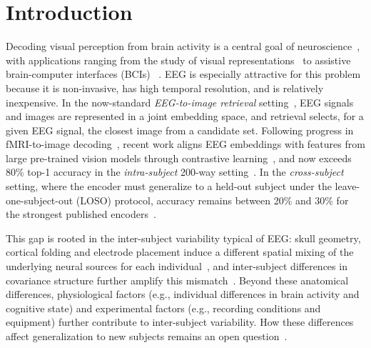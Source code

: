 \documentclass[10pt,twocolumn,letterpaper]{article}
\begin{document}
\section{Introduction}
\label{sec:intro}

Decoding visual perception from brain activity is a central goal of neuroscience~\cite{kamitani2005decoding,carlson2013representational,grootswagers2017decoding}, with applications ranging from the study of visual representations~\cite{cichy2014resolving,contini2017decoding} to assistive brain-computer interfaces (BCIs) ~\cite{lawhern2018eegnet,gao2021interface}. EEG is especially attractive for this problem because it is non-invasive, has high temporal resolution, and is relatively inexpensive. In the now-standard \emph{EEG-to-image retrieval} setting~\cite{spampinato2017deep,gifford2022things,grootswagers2022things}, EEG signals and images are represented in a joint embedding space, and retrieval selects, for a given EEG signal, the closest image from a candidate set. Following progress in fMRI-to-image decoding~\cite{takagi2023highres,ozcelik2023natural,scotti2023mindeye,scotti2024mindeye2}, recent work aligns EEG embeddings with features from large pre-trained vision models through contrastive learning~\cite{song2024nice,li2024atm,wu2025ubp,zhang2025neurobridge,du2025shallow}, and now exceeds 80\% top-1 accuracy in the \emph{intra-subject} 200-way setting~\cite{du2025shallow}. In the \emph{cross-subject} setting, where the encoder must generalize to a held-out subject under the leave-one-subject-out (LOSO) protocol, accuracy remains between 20\% and 30\% for the strongest published encoders~\cite{du2025shallow,zhang2025neurobridge,cui2026score}.

This gap is rooted in the inter-subject variability typical of EEG: skull geometry, cortical folding and electrode placement induce a different spatial mixing of the underlying neural sources for each individual~\cite{onton2006imaging}, and inter-subject differences in covariance structure further amplify this mismatch~\cite{blankertz2008optimizing,barachant2010riemannian,samek2013transferring,haufe2014interpretation}. Beyond these anatomical differences, physiological factors (e.g., individual differences in brain activity and cognitive state) and experimental factors (e.g., recording conditions and equipment) further contribute to inter-subject variability.  How these differences affect generalization to new subjects remains an open question~\cite{li2026crosssubject,lin2026identitytrap}.
\end{document}
